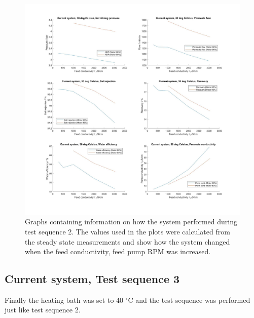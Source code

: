 \begin{figure}[H]
    \centering
    \includegraphics[width=1.1\textwidth]{Key30}
    \caption{Graphs containing information on how the system performed during test sequence 2. The values used in the plots were calculated from the steady state measurements and show how the system changed when the feed conductivity, feed pump RPM was increased.}
    \label{fig:K30}
\end{figure}

\newpage

\subsection{Current system, Test sequence 3}

Finally the heating bath was set to 40 $^{\circ}$C and the test sequence was performed just like test sequence 2. 

